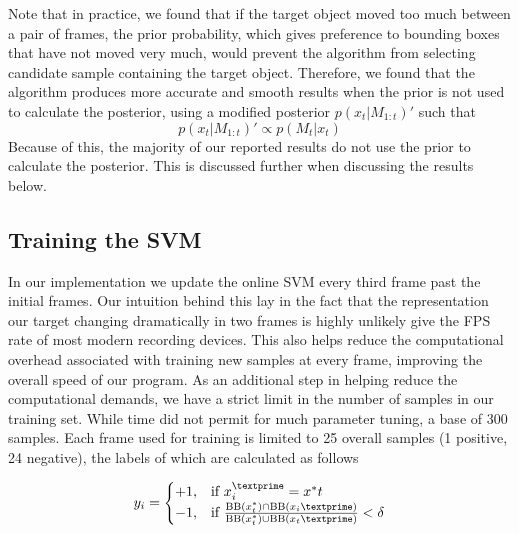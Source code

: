 \documentclass{sig-alternate-05-2015}
\begin{document}
Note that in practice, we found that if the target object moved too much between a pair of frames, the prior probability, which gives preference to bounding boxes that have not moved very much, would prevent the algorithm from selecting candidate sample containing the target object.
Therefore, we found that the algorithm produces more accurate and smooth results when the prior is not used to calculate the posterior, using a modified posterior $p(x_t|M_{1:t})'$ such that
\begin{equation}
\label{eq:posterior-mod}
p(x_t|M_{1:t})' \propto p(M_t |x_t)
\end{equation}
Because of this, the majority of our reported results do not use the prior to calculate the posterior.
This is discussed further when discussing the results below.

\subsection{Training the SVM}
\label{sec:training-svm} %
In our implementation we update the online SVM every third frame past the initial frames. Our intuition behind this lay in the fact that the representation our target changing dramatically in two frames is highly unlikely give the FPS rate of most modern recording devices. This also helps reduce the computational overhead associated with training new samples at every frame, improving the overall speed of our program. As an additional step in helping reduce the computational demands, we have a strict limit in the number of samples in our training set. While time did not permit for much parameter tuning, a base of 300 samples. Each frame used for training is limited to 25 overall samples (1 positive, 24 negative), the labels of which are calculated as follows\newline

\begin{equation}
	y_i =
	\begin{cases}
		+1, & \text{if } x_i^\textprime = x^*t\\
		-1, & \text{if } \frac{\text{BB}(x_t^*)\cap \text{BB}(x_i\textprime)}{\text{BB}(x^*_t)\cup \text{BB}(x_t\textprime)} < \delta\\
	\end{cases}
\end{equation}
\end{document}

